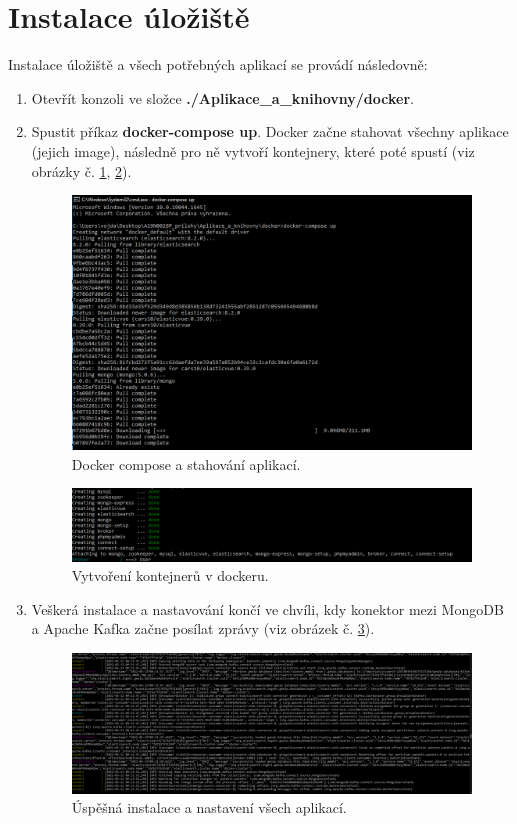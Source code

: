\section{Instalace úložiště}
Instalace úložiště a všech potřebných aplikací se provádí následovně:
\begin{enumerate}
\item Otevřít konzoli ve složce \textbf{./Aplikace\_a\_knihovny/docker}.
\item Spustit příkaz \textbf{docker-compose up}. Docker začne stahovat všechny aplikace (jejich image), následně pro ně vytvoří kontejnery, které poté spustí (viz obrázky č. \ref{fig:docker_compose}, \ref{fig:docker_containers}).
	\begin{figure}[H]
	\centering
	\includegraphics[width=16cm]{img/manual/docker_compose}
	\caption{Docker compose a stahování aplikací.}
	\label{fig:docker_compose}
	\end{figure}
		\begin{figure}[H]
	\centering
	\includegraphics[width=16cm]{img/manual/docker_create_containers}
	\caption{Vytvoření kontejnerů v dockeru.}
	\label{fig:docker_containers}
	\end{figure}
\item Veškerá instalace a nastavování končí ve chvíli, kdy konektor mezi MongoDB a Apache Kafka začne posílat zprávy (viz obrázek č. \ref{fig:docker_done_creating}).
		\begin{figure}[H]
	\centering
	\includegraphics[width=16cm]{img/manual/docker_done_creating}
	\caption{Úspěšná instalace a nastavení všech aplikací.}
	\label{fig:docker_done_creating}
	\end{figure}
\end{enumerate}

